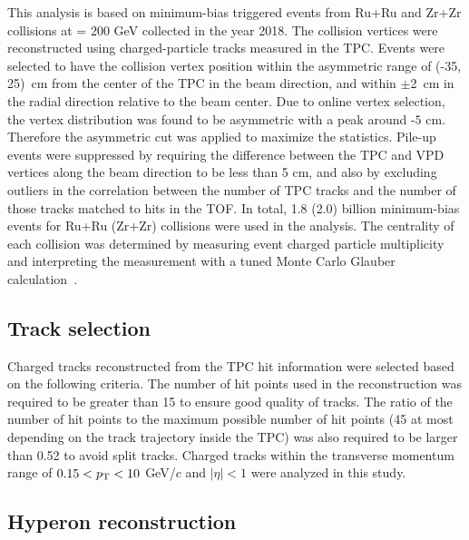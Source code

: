 \documentclass[preprint,5p,times,twocolumn]{elsarticle}
\begin{document}
This analysis is based on minimum-bias triggered events from Ru+Ru and Zr+Zr collisions at \snn = 200 GeV  collected in the year 2018. 
The collision vertices were reconstructed using charged-particle tracks measured in the TPC. 
Events were selected to have the collision vertex position within the asymmetric range of (-35, 25)~cm from the center of the TPC in the beam direction, and within $\pm$2~cm in the radial direction relative to the beam center. 
Due to online vertex selection, the vertex distribution was found to be asymmetric with a peak around $\text{-}5$ cm. 
Therefore the asymmetric cut was applied to maximize the statistics.
Pile-up events were suppressed by requiring the difference between the TPC and VPD vertices along the beam direction to be less than 5 cm, and also by excluding outliers in the correlation between the number of TPC tracks and the number of those tracks matched to hits in the TOF.
In total, 1.8 (2.0) billion minimum-bias events for Ru+Ru (Zr+Zr) collisions were used in the analysis. 
The centrality of each collision was determined by measuring event charged particle multiplicity and interpreting the measurement with a tuned Monte Carlo Glauber calculation~\cite{STAR:2021mii,Miller:2007ri}. 


\subsection{Track selection}

Charged tracks reconstructed from the TPC hit information were selected based on the following criteria.  
The number of hit points used in the reconstruction was required to be greater than 15 to ensure good quality of tracks. 
The ratio of the number of hit points to the maximum possible number of hit points (45 at most depending on the track trajectory inside the TPC) was also required to be larger than 0.52 to avoid split tracks.
Charged tracks within the transverse momentum range of $0.15 < p_{\rm T} < 10$ GeV/$c$ and $|\eta| < 1$ were analyzed in this study. 


\subsection{Hyperon reconstruction}
\end{document}
